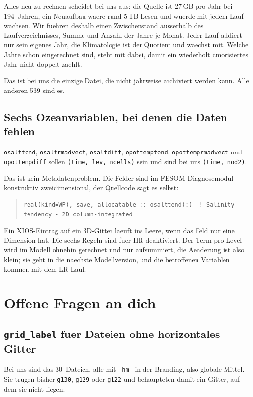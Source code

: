 \documentclass[11pt,a4paper]{article}
\newcommand{\code}[1]{\texttt{\small #1}}
\begin{document}
Alles neu zu rechnen scheidet bei uns aus: die Quelle ist 27\,GB pro Jahr bei
194~Jahren, ein Neuaufbau waere rund 5\,TB Lesen und wuerde mit jedem Lauf wachsen.
Wir fuehren deshalb einen Zwischenstand ausserhalb des Laufverzeichnisses, Summe und
Anzahl der Jahre je Monat. Jeder Lauf addiert nur sein eigenes Jahr, die Klimatologie
ist der Quotient und waechst mit. Welche Jahre schon eingerechnet sind, steht mit
dabei, damit ein wiederholt cmorisiertes Jahr nicht doppelt zaehlt.

Das ist bei uns die einzige Datei, die nicht jahrweise archiviert werden kann. Alle
anderen 539 sind es.

\subsection*{Sechs Ozeanvariablen, bei denen die Daten fehlen}

\code{osalttend}, \code{osaltrmadvect}, \code{osaltdiff}, \code{opottemptend},
\code{opottemprmadvect} und \code{opottempdiff} sollen \code{(time, lev, ncells)}
sein und sind bei uns \code{(time, nod2)}.

Das ist kein Metadatenproblem. Die Felder sind im FESOM-Diagnosemodul konstruktiv
zweidimensional, der Quellcode sagt es selbst:

\begin{quote}
\code{real(kind=WP), save, allocatable :: osalttend(:)\ \ ! Salinity tendency - 2D column-integrated}
\end{quote}

Ein XIOS-Eintrag auf ein 3D-Gitter laeuft ins Leere, wenn das Feld nur eine Dimension
hat. Die sechs Regeln sind fuer HR deaktiviert. Der Term pro Level wird im Modell
ohnehin gerechnet und nur aufsummiert, die Aenderung ist also klein; sie geht in die
naechste Modellversion, und die betroffenen Variablen kommen mit dem LR-Lauf.

\section{Offene Fragen an dich}

\subsection*{\code{grid\_label} fuer Dateien ohne horizontales Gitter}

Bei uns sind das 30~Dateien, alle mit \code{-hm-} in der Branding, also globale
Mittel. Sie trugen bisher \code{g130}, \code{g129} oder \code{g122} und behaupteten
damit ein Gitter, auf dem sie nicht liegen.
\end{document}
